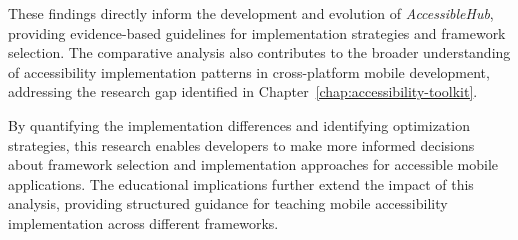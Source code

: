 These findings directly inform the development and evolution of \textit{AccessibleHub}, providing evidence-based guidelines for implementation strategies and framework selection. The comparative analysis also contributes to the broader understanding of accessibility implementation patterns in cross-platform mobile development, addressing the research gap identified in Chapter~\ref{chap:accessibility-toolkit}.

By quantifying the implementation differences and identifying optimization strategies, this research enables developers to make more informed decisions about framework selection and implementation approaches for accessible mobile applications. The educational implications further extend the impact of this analysis, providing structured guidance for teaching mobile accessibility implementation across different frameworks.